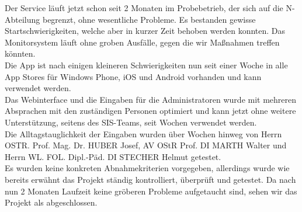 
Der Service läuft jetzt schon seit 2 Monaten im Probebetrieb, der sich auf die N-Abteilung begrenzt, ohne wesentliche Probleme. Es bestanden gewisse Startschwierigkeiten, welche aber in kurzer Zeit behoben werden konnten. Das Monitorsystem läuft ohne groben Ausfälle, gegen die wir Maßnahmen treffen könnten.\\
Die App ist nach einigen kleineren Schwierigkeiten nun seit einer Woche in alle App Stores für Windows Phone, iOS und Android vorhanden und kann verwendet werden.\\
Das Webinterface und die Eingaben für die Administratoren wurde mit mehreren Absprachen mit den zuständigen Personen optimiert und kann jetzt ohne weitere Unterstützung, seitens des SIS-Teams, seit Wochen verwendet werden.\\
Die Alltagstauglichkeit der Eingaben wurden über Wochen hinweg von Herrn OSTR. Prof. Mag. Dr. HUBER Josef, AV OStR Prof. DI MARTH Walter und Herrn WL. FOL. Dipl.-Päd. DI STECHER Helmut getestet.\\
Es wurden keine konkreten Abnahmekriterien vorgegeben, allerdings wurde wie bereits erwähnt das Projekt ständig kontrolliert, überprüft und getestet. Da nach nun 2 Monaten Laufzeit keine gröberen Probleme aufgetaucht sind, sehen wir das Projekt als abgeschlossen.
